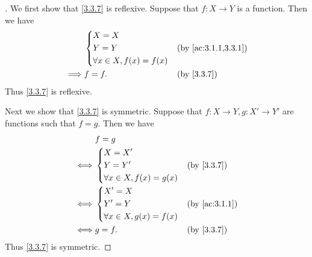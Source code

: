 \begin{proof}[]
  We first show that \cref{3.3.7} is reflexive.
  Suppose that \(f : X \to Y\) is a function.
  Then we have
  \begin{align*}
             & \begin{dcases}
                 X = X \\
                 Y = Y \\
                 \forall x \in X, f(x) = f(x)
               \end{dcases} &  & \by{ac:3.1.1,3.3.1}        \\
    \implies & f = f.                       &  & \by{3.3.7}
  \end{align*}
  Thus \cref{3.3.7} is reflexive.

  Next we show that \cref{3.3.7} is symmetric.
  Suppose that \(f : X \to Y, g : X' \to Y'\) are functions such that \(f = g\).
  Then we have
  \begin{align*}
         & f = g                                        \\
    \iff & \begin{dcases}
             X = X' \\
             Y = Y' \\
             \forall x \in X, f(x) = g(x)
           \end{dcases} &  & \by{3.3.7}                 \\
    \iff & \begin{dcases}
             X' = X \\
             Y' = Y \\
             \forall x \in X, g(x) = f(x)
           \end{dcases} &  & \by{ac:3.1.1}              \\
    \iff & g = f.                       &  & \by{3.3.7}
  \end{align*}
  Thus \cref{3.3.7} is symmetric.


\end{proof}
